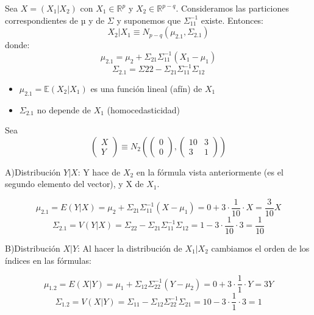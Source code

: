 \documentclass[palatino,nochap]{apuntes}
\begin{document}
\begin{prop}

Sea $X=(X_1|X_2)$ con $X_1∈ℝ^p$ y $X_2∈ℝ^{p-q}$. Consideramos las particiones correspondientes de $µ$ y de $\Sigma$ y suponemos que $\Sigma_{11}^{-1}$ existe. Entonces:
\[
X_2|X_1 \equiv N_{p-q}(\mu_{2.1},\Sigma_{2.1})
\]
donde:
\[
\mu_{2.1}=\mu_2 +\Sigma_{21}\Sigma_{11}^{-1}(X_1-\mu_1)
\]
\[
\Sigma_{2.1}=\Sigma{22}-\Sigma_{21}\Sigma_{11}^{-1}\Sigma_{12}
\]

\begin{itemize}
\item $\mu_{2.1}=\mathbb{E}(X_2|X_1)$ es una función lineal (afín) de $X_1$
\item $\Sigma_{2.1}$ no depende de $X_1$ (homocedasticidad)
\end{itemize}

\end{prop}

\begin{example}

Sea \[\left(
\begin{array}{c}
X \\
Y
\end{array}
\right) \equiv N_2 \left( \left(
\begin{array}{c}
0 \\
0
\end{array}
\right), \begin{pmatrix}10&3\\3&1\end{pmatrix} \right)\]

A)Distribución $Y|X$:
Y hace de $X_2$ en la fórmula vista anteriormente (es el segundo elemento del vector), y X de $X_1$.

\[
\mu_{2.1}=E(Y|X)=\mu_2+\Sigma_{21}\Sigma_{11}^{-1}(X-\mu_1)=0+3\cdot \frac{1}{10}\cdot X = \frac{3}{10}X
\]
\[
\Sigma_{2.1}=V(Y|X) = \Sigma_{22}-\Sigma_{21}\Sigma_{11}^{-1}\Sigma_{12} = 1-3\cdot\frac{1}{10}\cdot3 = \frac{1}{10}
\]

B)Distribución $X|Y$:
Al hacer la distribución de $X_1|X_2$ cambiamos el orden de los índices en las fórmulas:

\[
\mu_{1.2}=E(X|Y)=\mu_1+\Sigma_{12}\Sigma_{22}^{-1}(Y-\mu_2)=0+3\cdot \frac{1}{1}\cdot Y = 3Y
\]
\[
\Sigma_{1.2}=V(X|Y) = \Sigma_{11}-\Sigma_{12}\Sigma_{22}^{-1}\Sigma_{21} = 10-3\cdot\frac{1}{1}\cdot3 = 1
\]

\end{example}
\end{document}
